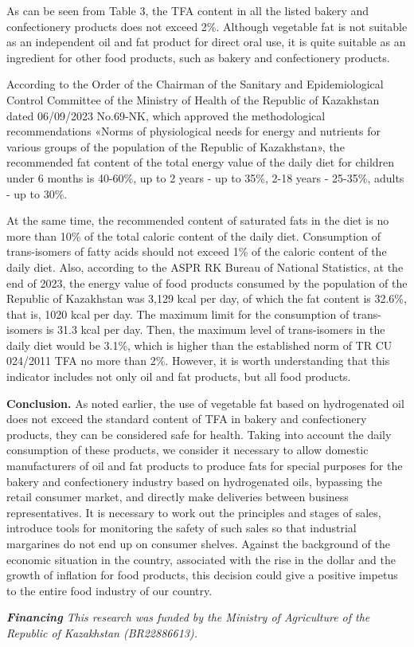 \begin{multicols}{2}
As can be seen from Table 3, the TFA content in all the listed bakery
and confectionery products does not exceed 2\%. Although vegetable fat
is not suitable as an independent oil and fat product for direct oral
use, it is quite suitable as an ingredient for other food products, such
as bakery and confectionery products.

According to the Order of the Chairman of the Sanitary and
Epidemiological Control Committee of the Ministry of Health of the
Republic of Kazakhstan dated 06/09/2023 No.69-NK, which approved the
methodological recommendations «Norms of physiological needs for energy
and nutrients for various groups of the population of the Republic of
Kazakhstan», the recommended fat content of the total energy value of
the daily diet for children under 6 months is 40-60\%, up to 2 years -
up to 35\%, 2-18 years - 25-35\%, adults - up to 30\%.

At the same time, the recommended content of saturated fats in the diet
is no more than 10\% of the total caloric content of the daily diet.
Consumption of trans-isomers of fatty acids should not exceed 1\% of the
caloric content of the daily diet. Also, according to the ASPR RK Bureau
of National Statistics, at the end of 2023, the energy value of food
products consumed by the population of the Republic of Kazakhstan was
3,129 kcal per day, of which the fat content is 32.6\%, that is, 1020
kcal per day. The maximum limit for the consumption of trans-isomers is
31.3 kcal per day. Then, the maximum level of trans-isomers in the daily
diet would be 3.1\%, which is higher than the established norm of TR CU
024/2011 TFA no more than 2\%. However, it is worth understanding that
this indicator includes not only oil and fat products, but all food
products.

{\bfseries Conclusion.} As noted earlier, the use of vegetable fat based on
hydrogenated oil does not exceed the standard content of TFA in bakery
and confectionery products, they can be considered safe for health.
Taking into account the daily consumption of these products, we consider
it necessary to allow domestic manufacturers of oil and fat products to
produce fats for special purposes for the bakery and confectionery
industry based on hydrogenated oils, bypassing the retail consumer
market, and directly make deliveries between business representatives.
It is necessary to work out the principles and stages of sales,
introduce tools for monitoring the safety of such sales so that
industrial margarines do not end up on consumer shelves. Against the
background of the economic situation in the country, associated with the
rise in the dollar and the growth of inflation for food products, this
decision could give a positive impetus to the entire food industry of
our country.

\emph{{\bfseries Financing} This research was funded by the Ministry of
Agriculture of the Republic of Kazakhstan (BR22886613).}
\end{multicols}

